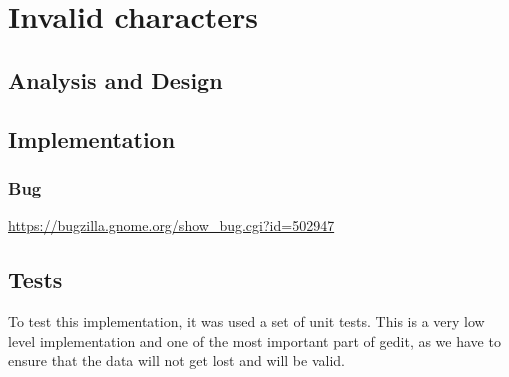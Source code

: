 
\chapter{Invalid characters}

\section{Analysis and Design}

\section{Implementation}

\subsection{Bug}

\noindent\url{https://bugzilla.gnome.org/show_bug.cgi?id=502947}

\section{Tests}

To test this implementation, it was used a set of unit tests. This is a very low level implementation and one of the most important part of gedit, as we have to ensure that the data will not get lost and will be valid.

